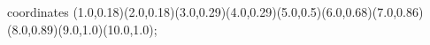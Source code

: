 					coordinates { (1.0,0.18)(2.0,0.18)(3.0,0.29)(4.0,0.29)(5.0,0.5)(6.0,0.68)(7.0,0.86)(8.0,0.89)(9.0,1.0)(10.0,1.0)};